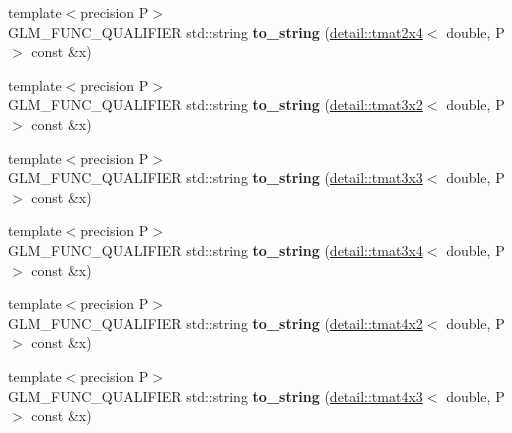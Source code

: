 \begin{DoxyCompactItemize}
\item 
\hypertarget{namespaceglm_af5a211cd0d2ae100217f01efcfcc3a64}{{\footnotesize template$<$precision P$>$ }\\G\-L\-M\-\_\-\-F\-U\-N\-C\-\_\-\-Q\-U\-A\-L\-I\-F\-I\-E\-R std\-::string {\bfseries to\-\_\-string} (\hyperlink{structglm_1_1detail_1_1tmat2x4}{detail\-::tmat2x4}$<$ double, P $>$ const \&x)}\label{namespaceglm_af5a211cd0d2ae100217f01efcfcc3a64}

\item 
\hypertarget{namespaceglm_acab2e86e3e8b184152c82bde39a9da6a}{{\footnotesize template$<$precision P$>$ }\\G\-L\-M\-\_\-\-F\-U\-N\-C\-\_\-\-Q\-U\-A\-L\-I\-F\-I\-E\-R std\-::string {\bfseries to\-\_\-string} (\hyperlink{structglm_1_1detail_1_1tmat3x2}{detail\-::tmat3x2}$<$ double, P $>$ const \&x)}\label{namespaceglm_acab2e86e3e8b184152c82bde39a9da6a}

\item 
\hypertarget{namespaceglm_a86b22d004f70933e0e8c7c524ce203bb}{{\footnotesize template$<$precision P$>$ }\\G\-L\-M\-\_\-\-F\-U\-N\-C\-\_\-\-Q\-U\-A\-L\-I\-F\-I\-E\-R std\-::string {\bfseries to\-\_\-string} (\hyperlink{structglm_1_1detail_1_1tmat3x3}{detail\-::tmat3x3}$<$ double, P $>$ const \&x)}\label{namespaceglm_a86b22d004f70933e0e8c7c524ce203bb}

\item 
\hypertarget{namespaceglm_a6ca2fcca704c9d5d4038cc6c2963b5f7}{{\footnotesize template$<$precision P$>$ }\\G\-L\-M\-\_\-\-F\-U\-N\-C\-\_\-\-Q\-U\-A\-L\-I\-F\-I\-E\-R std\-::string {\bfseries to\-\_\-string} (\hyperlink{structglm_1_1detail_1_1tmat3x4}{detail\-::tmat3x4}$<$ double, P $>$ const \&x)}\label{namespaceglm_a6ca2fcca704c9d5d4038cc6c2963b5f7}

\item 
\hypertarget{namespaceglm_a014ab0892ae1ae60db9e0b302c509478}{{\footnotesize template$<$precision P$>$ }\\G\-L\-M\-\_\-\-F\-U\-N\-C\-\_\-\-Q\-U\-A\-L\-I\-F\-I\-E\-R std\-::string {\bfseries to\-\_\-string} (\hyperlink{structglm_1_1detail_1_1tmat4x2}{detail\-::tmat4x2}$<$ double, P $>$ const \&x)}\label{namespaceglm_a014ab0892ae1ae60db9e0b302c509478}

\item 
\hypertarget{namespaceglm_a8c03a32a98613acfcffa00b4a39179b2}{{\footnotesize template$<$precision P$>$ }\\G\-L\-M\-\_\-\-F\-U\-N\-C\-\_\-\-Q\-U\-A\-L\-I\-F\-I\-E\-R std\-::string {\bfseries to\-\_\-string} (\hyperlink{structglm_1_1detail_1_1tmat4x3}{detail\-::tmat4x3}$<$ double, P $>$ const \&x)}\label{namespaceglm_a8c03a32a98613acfcffa00b4a39179b2}


\end{DoxyCompactItemize}
